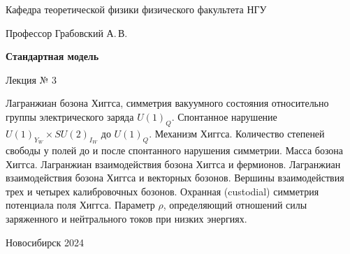 \documentclass[12pt,pagesize,paper=192mm:108mm,landscape]{scrbook}
\begin{document}
\begin{titlepage}
\begin{center}
    Кафедра теоретической физики физического факультета НГУ
    \medskip

    \Large
    Профессор Грабовский А.\,В.
    \smallskip

    \huge
    \textbf{Стандартная модель}
    \smallskip

    \Large
    Лекция № 3
    \vfill

    \normalsize
    \begin{minipage}{0.85\linewidth}
      Лагранжиан бозона Хиггса, симметрия вакуумного состояния
      относительно группы электрического заряда $U(1)_Q$. Спонтанное
      нарушение $U(1)_ {Y_W} \times SU(2)_{I_W}$ до $U(1)_Q$. Механизм
      Хиггса. Количество степеней свободы у полей до и после
      спонтанного нарушения симметрии. Масса бозона Хиггса. Лагранжиан
      взаимодействия бозона Хиггса и фермионов. Лагранжиан
      взаимодействия бозона Хиггса и векторных бозонов. Вершины
      взаимодействия трех и четырех калибровочных бозонов. Охранная
      (custodial) симметрия потенциала поля Хиггса. Параметр $\rho$,
      определяющий отношений силы заряженного и нейтрального токов при
      низких энергиях.
    \end{minipage}
    \vfill

    \normalsize \ccbysa\hspace{0.5em}  Новосибирск 2024
  \end{center}
\end{titlepage}
\end{document}
